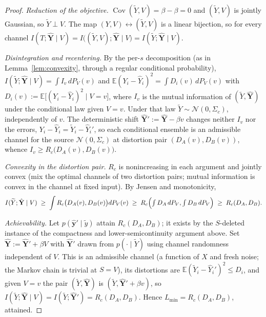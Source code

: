 ﻿\documentclass[11pt,onecolumn]{IEEEtran}
\newcommand{\E}{\mathbb{E}}
\newcommand{\Cov}{\operatorname{Cov}}
\newcommand{\hY}{\widehat{Y}}
\begin{document}
\begin{proof}
\emph{Reduction of the objective.} $\Cov(\widetilde Y,V)=\beta-\beta=0$
and $(\widetilde Y,V)$ is jointly Gaussian, so $\widetilde Y\perp V$.
The map $(Y,V)\leftrightarrow(\widetilde Y,V)$ is a linear bijection,
so for every channel
$I(T;\hat{\mathbf Y}\mid V)
=I\bigl((\widetilde Y,V);\hat{\mathbf Y}\mid V\bigr)
=I(\widetilde Y;\hat{\mathbf Y}\mid V)$.

\emph{Disintegration and recentering.} By the per-$s$ decomposition
(as in Lemma~\ref{lem:convexity}, through a regular conditional
probability),
$I(\widetilde Y;\hat{\mathbf Y}\mid V)=\int I_v\,dP_V(v)$ and
$\E(Y_i-\hY_i)^2=\int D_i(v)\,dP_V(v)$ with
$D_i(v):=\E\bigl[(Y_i-\hY_i)^2\mid V=v\bigr]$, where $I_v$ is the
mutual information of $(\widetilde Y,\hat{\mathbf Y})$ under the
conditional law given $V=v$. Under that law $\widetilde Y\sim\mathcal
N(0,\Sigma_c)$, independently of $v$. The deterministic shift
$\hat{\mathbf Y}':=\hat{\mathbf Y}-\beta v$ changes neither $I_v$ nor
the errors, $Y_i-\hY_i=\widetilde Y_i-\hY_i'$, so each conditional
ensemble is an admissible channel for the source $\mathcal
N(0,\Sigma_c)$ at distortion pair $(D_A(v),D_B(v))$, whence
$I_v\ge R_c\bigl(D_A(v),D_B(v)\bigr)$.

\emph{Convexity in the distortion pair.} $R_c$ is nonincreasing in each
argument and jointly convex (mix the optimal channels of two distortion
pairs; mutual information is convex in the channel at fixed input). By
Jensen and monotonicity,
\[
I(\widetilde Y;\hat{\mathbf Y}\mid V)
\;\ge\;\int R_c\bigl(D_A(v),D_B(v)\bigr)dP_V(v)
\;\ge\;R_c\Bigl(\textstyle\int D_A\,dP_V,\int D_B\,dP_V\Bigr)
\;\ge\;R_c(D_A,D_B).
\]

\emph{Achievability.} Let $p(\hat{\mathbf y}'\mid\tilde y)$ attain
$R_c(D_A,D_B)$; it exists by the $S$-deleted instance of the
compactness and lower-semicontinuity argument above. Set
$\hat{\mathbf Y}:=\hat{\mathbf Y}'+\beta V$ with $\hat{\mathbf Y}'$
drawn from $p(\cdot\mid\widetilde Y)$ using channel randomness
independent of $V$. This is an admissible channel (a function of $X$
and fresh noise; the Markov chain is trivial at $S=V$), its distortions
are $\E(\widetilde Y_i-\hY_i')^2\le D_i$, and given $V=v$ the pair
$(\widetilde Y,\hat{\mathbf Y})$ is $(\widetilde Y,\hat{\mathbf
Y}'+\beta v)$, so $I(\widetilde Y;\hat{\mathbf Y}\mid V)
=I(\widetilde Y;\hat{\mathbf Y}')=R_c(D_A,D_B)$. Hence
$L_{\min}=R_c(D_A,D_B)$, attained.


\end{proof}
\end{document}
